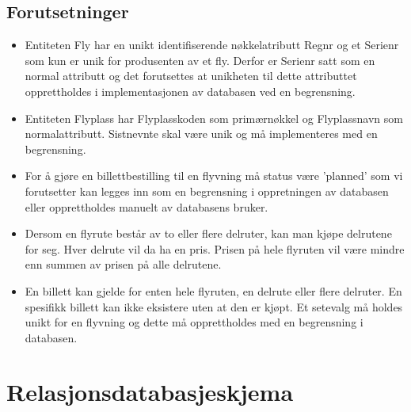 \documentclass[a4paper,11pt, norsk]{article}
\begin{document}
\subsection{Forutsetninger}
\begin{itemize}[noitemsep,topsep=0pt,parsep=0pt,partopsep=0pt]
\item Entiteten Fly har en unikt identifiserende nøkkelatributt Regnr og et Serienr som kun er unik for produsenten av et fly. Derfor er \mbox{Serienr} satt som en normal attributt og det forutsettes at unikheten til \mbox{dette} attributtet opprettholdes i implementasjonen av databasen ved en \mbox{begrensning}.  
\item Entiteten Flyplass har Flyplasskoden som primærnøkkel og Flyplassnavn som normalattributt. Sistnevnte skal være unik og må implementeres med en begrensning.
\item For å gjøre en billettbestilling til en flyvning må status være 'planned' som vi forutsetter kan legges inn som en begrensning i oppretningen av databasen eller opprettholdes manuelt av databasens bruker. 
\item Dersom en flyrute består av to eller flere delruter, kan man kjøpe delrutene for seg. Hver delrute vil da ha en pris. Prisen på hele flyruten vil være
mindre enn summen av prisen på alle delrutene. 
\item En billett kan gjelde for enten hele flyruten, en delrute eller flere delruter. En spesifikk billett kan ikke eksistere uten at den er kjøpt. Et setevalg må holdes unikt for en flyvning og dette må opprettholdes med en begrensning i databasen.
\end{itemize}

\newpage{}

\section{Relasjonsdatabasjeskjema}
\end{document}
